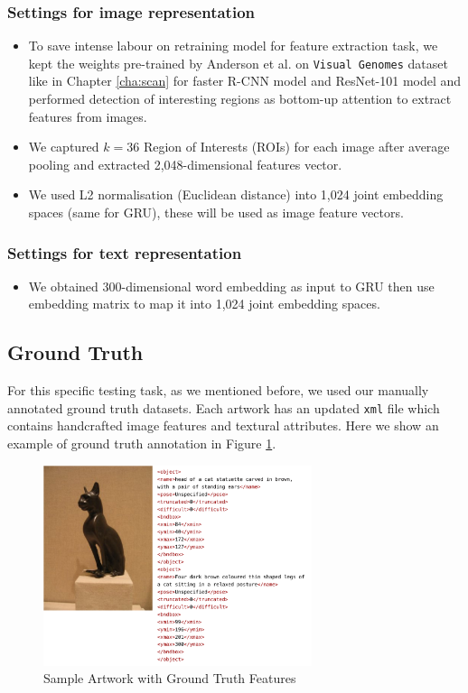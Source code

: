 \subsubsection{Settings for image representation}

\begin{itemize}
    \item To save intense labour on retraining model for feature extraction task, we kept the weights pre-trained by Anderson et al. on \verb|Visual Genomes| dataset like in Chapter \ref{cha:scan} for faster R-CNN model and ResNet-101 model and performed detection of interesting regions as bottom-up attention to extract features from images. 
    \item We captured $k=36$ Region of Interests (ROIs) for each image after average pooling and extracted 2,048-dimensional features vector.
    \item We used L2 normalisation (Euclidean distance) into 1,024 joint embedding spaces (same for GRU), these will be used as image feature vectors.
\end{itemize}

\subsubsection{Settings for text representation}

\begin{itemize}
    \item We obtained 300-dimensional word embedding as input to GRU then use embedding matrix to map it into 1,024 joint embedding spaces.
\end{itemize}

\subsection{Ground Truth}

For this specific testing task, as we mentioned before, we used our manually annotated ground truth datasets. Each artwork has an updated \verb|xml| file which contains handcrafted image features and textural attributes. Here we show an example of ground truth annotation in Figure \ref{fig:sampledata}.

\begin{figure}[h!]
\centering
\includegraphics[width=0.7\textwidth]{sampledata.pdf}
\caption{Sample Artwork with Ground Truth Features}
\label{fig:sampledata}
\end{figure}

